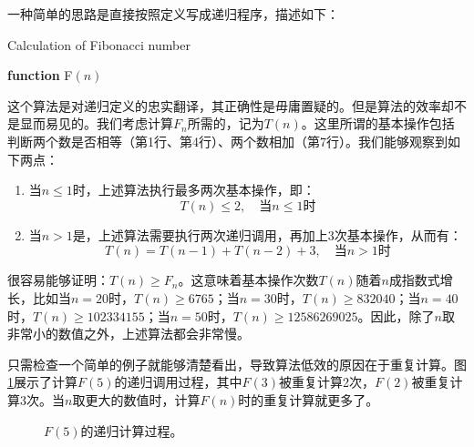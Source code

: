 	
	一种简单的思路是直接按照定义写成递归程序，描述如下：
\begin{algorithm}[H]
\caption{Calculation of Fibonacci number}\label{Fibonacci1}
{\bf function} {\sc F}{$(n)$} 
\begin{algorithmic}[1]
	\ELSE
	\ENDIF
\end{algorithmic}
\end{algorithm}	
这个算法是对递归定义的忠实翻译，其正确性是毋庸置疑的。但是算法的效率却不是显而易见的。我们考虑计算$F_{n}$所需的，记为$T(n)$。这里所谓的基本操作包括判断两个数是否相等（第1行、第4行）、两个数相加（第7行）。我们能够观察到如下两点：
\begin{enumerate}[(1)]
	\item 当$n\leq 1$时，上述算法执行最多两次基本操作，即：
\[
	T(n) \leq 2,  \quad \text{当} n \leq 1\text{时}
\]	
	\item 当$n>1$是，上述算法需要执行两次递归调用，再加上3次基本操作，从而有：
\[
	T(n) = T(n-1)+T(n-2) + 3,  \quad \text{当} n > 1\text{时}
\]	
\end{enumerate}
很容易能够证明：$T(n) \geq F_{n}$。这意味着基本操作次数$T(n)$随着$n$成指数式增长，比如当$n=20$时，$T(n)\geq 6765$；当$n=30$时，$T(n)\geq 832040$；当$n=40$时，$T(n)\geq 102334155$；当$n=50$时，$T(n)\geq 12586269025$。因此，除了$n$取非常小的数值之外，上述算法都会非常慢。

只需检查一个简单的例子就能够清楚看出，导致算法低效的原因在于重复计算。图\ref{F5}展示了计算$F(5)$的递归调用过程，其中$F(3)$被重复计算2次，$F(2)$被重复计算3次。当$n$取更大的数值时，计算$F(n)$时的重复计算就更多了。

\begin{figure}[H]\centering

   \caption{\fangsong $F(5)$的递归计算过程。}
   \label{F5}
\end{figure}

